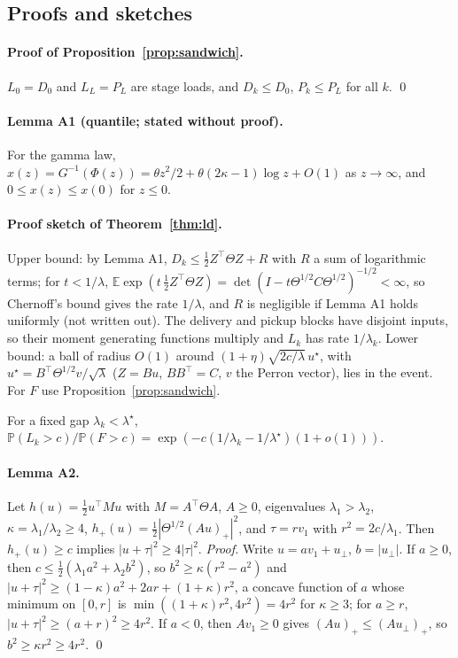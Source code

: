 \documentclass[ijoc,sglanonrev]{informs4}
\newcommand{\E}{\mathbb{E}}
\renewcommand{\P}{\mathbb{P}}
\begin{document}
\begin{APPENDICES}
\section{Proofs and sketches}
\label{app:proofs}

\paragraph{Proof of Proposition~\ref{prop:sandwich}.} $L_0 = D_0$ and $L_L = P_L$
are stage loads, and $D_k\le D_0$, $P_k\le P_L$ for all $k$. \qed

\paragraph{Lemma A1 (quantile; stated without proof).} For the gamma law,
$x(z) = G^{-1}(\Phi(z)) = \theta z^2/2 + \theta(2\kappa-1)\log z + O(1)$ as
$z\to\infty$, and $0\le x(z)\le x(0)$ for $z\le 0$.

\paragraph{Proof sketch of Theorem~\ref{thm:ld}.} Upper bound: by Lemma A1,
$D_k\le \tfrac12 Z^\top\Theta Z + R$ with $R$ a sum of logarithmic terms; for
$t<1/\lambda$, $\E\exp(t\,\tfrac12 Z^\top\Theta Z) =
\det(I - t\Theta^{1/2}C\Theta^{1/2})^{-1/2}<\infty$, so Chernoff's bound gives the
rate $1/\lambda$, and $R$ is negligible if Lemma A1 holds uniformly (not
written out). The delivery and pickup blocks have disjoint inputs, so their
moment generating functions multiply and $L_k$ has rate $1/\lambda_k$. Lower
bound: a ball of radius $O(1)$ around $(1+\eta)\sqrt{2c/\lambda}\,u^\star$, with
$u^\star = B^\top\Theta^{1/2}v/\sqrt\lambda$ ($Z=Bu$, $BB^\top = C$, $v$ the Perron
vector), lies in the event. For $F$ use Proposition~\ref{prop:sandwich}.

\begin{proposition}\label{prop:mass}
For a fixed gap $\lambda_k<\lambda^\star$,
$\P(L_k>c)/\P(F>c) = \exp(-c(1/\lambda_k-1/\lambda^\star)(1+o(1)))$.
\end{proposition}

\paragraph{Lemma A2.} Let $h(u) = \tfrac12 u^\top M u$ with $M=A^\top\Theta A$,
$A\ge 0$, eigenvalues $\lambda_1>\lambda_2$, $\kappa=\lambda_1/\lambda_2\ge 4$,
$h_+(u) = \tfrac12|\Theta^{1/2}(Au)_+|^2$, and $\tau = r v_1$ with
$r^2 = 2c/\lambda_1$. Then $h_+(u)\ge c$ implies $|u+\tau|^2\ge 4|\tau|^2$.
\emph{Proof.} Write $u = a v_1 + u_\perp$, $b=|u_\perp|$. If $a\ge0$, then
$c\le\tfrac12(\lambda_1a^2+\lambda_2b^2)$, so $b^2\ge\kappa(r^2-a^2)$ and
$|u+\tau|^2\ge(1-\kappa)a^2+2ar+(1+\kappa)r^2$, a concave function of $a$
whose minimum on $[0,r]$ is $\min((1+\kappa)r^2,4r^2) = 4r^2$ for $\kappa\ge3$;
for $a\ge r$, $|u+\tau|^2\ge(a+r)^2\ge4r^2$. If $a<0$, then $Av_1\ge0$ gives
$(Au)_+\le(Au_\perp)_+$, so $b^2\ge\kappa r^2\ge4r^2$. \qed


\end{APPENDICES}
\end{document}
